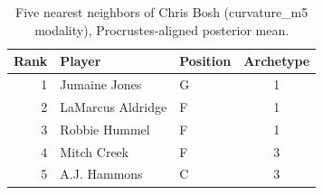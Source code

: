 \begin{table}[htbp]
  \centering\small
  \begin{tabular}{rllc}
    \toprule
    Rank & Player & Position & Archetype \\
    \midrule
    1 & Jumaine Jones & G & 1 \\
    2 & LaMarcus Aldridge & F & 1 \\
    3 & Robbie Hummel & F & 1 \\
    4 & Mitch Creek & F & 3 \\
    5 & A.J. Hammons & C & 3 \\
    \bottomrule
  \end{tabular}
  \caption{Five nearest neighbors of Chris Bosh (curvature_m5 modality), Procrustes-aligned posterior mean.}
  \label{tab:Chris_Bosh_neighbors_curvature_m5}
\end{table}

